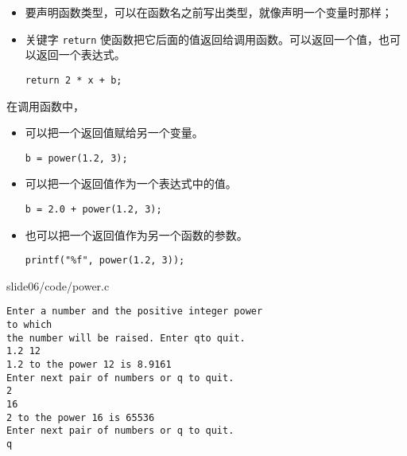 \begin{frame}[fragile]\ft{\secname}
\begin{itemize}
\item 要声明函数类型，可以在函数名之前写出类型，就像声明一个变量时那样；\\[0.1in]
\item 关键字 \lstinline|return| 使函数把它后面的值返回给调用函数。可以返回一个值，也可以返回一个表达式。
\begin{lstlisting}
return 2 * x + b;
\end{lstlisting}
\end{itemize}
\end{frame}


\begin{frame}[fragile]\ft{\secname}
在调用函数中，\vspace{0.1in}

\begin{itemize}
\item 可以把一个返回值赋给另一个变量。
\begin{lstlisting}
b = power(1.2, 3);
\end{lstlisting}
\item 可以把一个返回值作为一个表达式中的值。
\begin{lstlisting}
b = 2.0 + power(1.2, 3);
\end{lstlisting}
\item 也可以把一个返回值作为另一个函数的参数。
\begin{lstlisting}
printf("%f", power(1.2, 3));
\end{lstlisting}
\end{itemize}
\end{frame}

\begin{frame}
  
  {slide06/code/power.c}
\end{frame}


\begin{frame}[fragile]
\begin{lstlisting}[backgroundcolor=\color{red!10}]
Enter a number and the positive integer power
to which
the number will be raised. Enter qto quit.
1.2 12
1.2 to the power 12 is 8.9161
Enter next pair of numbers or q to quit.
2
16
2 to the power 16 is 65536
Enter next pair of numbers or q to quit.
q
\end{lstlisting}

\end{frame}

